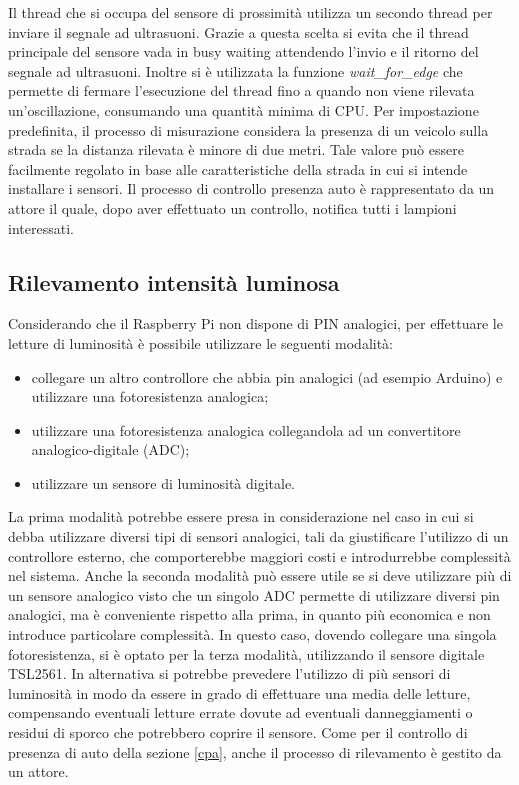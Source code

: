 Il thread che si occupa del sensore di prossimità utilizza un secondo thread per inviare il segnale ad ultrasuoni.
Grazie a questa scelta si evita che il thread principale del sensore vada in busy waiting attendendo l'invio e il ritorno del segnale ad ultrasuoni.
Inoltre si è utilizzata la funzione \textit{wait\_for\_edge} che permette di fermare l'esecuzione del thread fino a quando non viene rilevata un'oscillazione, consumando una quantità minima di CPU.
Per impostazione predefinita, il processo di misurazione considera la presenza di un veicolo sulla strada se la distanza rilevata è minore di due metri.
Tale valore può essere facilmente regolato in base alle caratteristiche della strada in cui si intende installare i sensori.
Il processo di controllo presenza auto è rappresentato da un attore il quale, dopo aver effettuato un controllo, notifica tutti i lampioni interessati.

\newpage


\subsection{Rilevamento intensità luminosa}
Considerando che il Raspberry Pi non dispone di PIN analogici, per effettuare le letture di luminosità è possibile utilizzare le seguenti modalità:
\begin{itemize}
 \item collegare un altro controllore che abbia pin analogici (ad esempio Arduino) e utilizzare una fotoresistenza analogica;
 \item utilizzare una fotoresistenza analogica collegandola ad un convertitore analogico-digitale (ADC);
 \item utilizzare un sensore di luminosità digitale.
\end{itemize}
La prima modalità potrebbe essere presa in considerazione nel caso in cui si debba utilizzare diversi tipi di sensori analogici, tali da giustificare l'utilizzo di un controllore esterno, che comporterebbe maggiori costi e introdurrebbe complessità nel sistema.
Anche la seconda modalità può essere utile se si deve utilizzare più di un sensore analogico visto che un singolo ADC permette di utilizzare diversi pin analogici, ma è conveniente rispetto alla prima, in quanto più economica e non introduce particolare complessità.
In questo caso, dovendo collegare una singola fotoresistenza, si è optato per la terza modalità, utilizzando il sensore digitale TSL2561.
In alternativa si potrebbe prevedere l'utilizzo di più sensori di luminosità in modo da essere in grado di effettuare una media delle letture, compensando eventuali letture errate dovute ad eventuali danneggiamenti o residui di sporco che potrebbero coprire il sensore.
Come per il controllo di presenza di auto della sezione \ref{cpa}, anche il processo di rilevamento è gestito da un attore.

